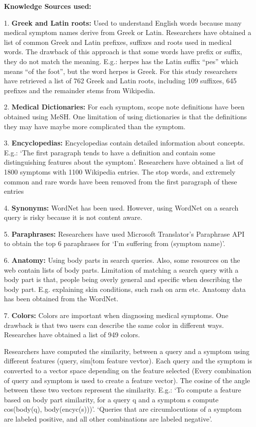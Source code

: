 \documentclass[]{article}
\begin{document}
\textbf{Knowledge Sources used:  }
 
1.\textbf{	Greek and Latin roots:} Used to understand English words because many medical symptom names derive from Greek or Latin. Researchers have obtained a list of common Greek and Latin prefixes, suffixes and roots used in medical words. The drawback of this approach is that some words have prefix or suffix, they do not match the meaning. E.g.: herpes has the Latin suffix “pes” which means “of the foot”, but the word herpes is Greek. For this study researchers have retrieved a list of 762 Greek and Latin roots, including 109 suffixes, 645 prefixes and the remainder stems from Wikipedia.
 
2.	\textbf{Medical Dictionaries:} For each symptom, scope note definitions have been obtained using MeSH. One limitation of using dictionaries is that the definitions they may have maybe more complicated than the symptom.

3.	\textbf{Encyclopedias:} Encyclopedias contain detailed information about concepts. E.g.: ‘The first paragraph tends to have a definition and contain some distinguishing features about the symptom’. Researchers have obtained a list of 1800 symptoms with 1100 Wikipedia entries. The stop words, and extremely common and rare words have been removed from the first paragraph of these entries

4.	\textbf{Synonyms:} WordNet has been used. However, using WordNet on a search query is risky because it is not content aware.

5.	\textbf{Paraphrases:} Researchers have used Microsoft Translator’s Paraphrase API to obtain the top 6 paraphrases for ‘I’m suffering from (symptom name)’.

6.	\textbf{Anatomy:} Using body parts in search queries. Also, some resources on the web contain 	lists of body parts. Limitation of matching a search query with a body part is that, people being overly general and specific when describing the body part. E.g. explaining skin conditions, such rash on arm etc. Anatomy data has been obtained from the WordNet. 

7.	\textbf{Colors:} Colors are important when diagnosing medical symptoms. One drawback is that two users can describe the same color in different ways. Researches have obtained a list of 949 colors. 

Researchers have computed the similarity, between a query and a symptom using different features (query, sim[tom feature vevtor). Each query and the symptom is converted to a vector space depending on the feature selected (Every combination of query and symptom is used to create a feature vector). The cosine of the angle between these two vectors represent the similarity. E.g.: ‘To compute a feature based on body part similarity, for a query q and a symptom s compute cos(body(q), body(encyc(s)))’. ‘Queries that are circumlocutions of a symptom are labeled positive, and all other combinations are labeled negative’. 
\end{document}
